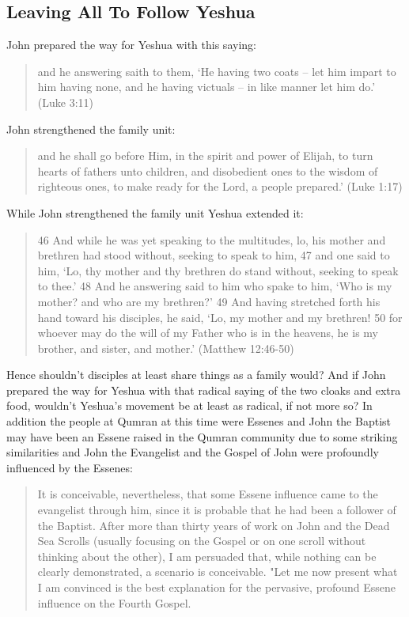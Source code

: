 \documentclass[11pt]{article}
\begin{document}
\subsection{Leaving All To Follow Yeshua} \label{leaving all to follow yeshua}
John prepared the way for Yeshua with this saying:
\begin{quote}
and he answering saith to them, `He having two coats -- let him impart to him having none, and he having victuals -- in like manner let him do.' (Luke 3:11) 
\end{quote}
John strengthened the family unit: 
\begin{quote}
and he shall go before Him, in the spirit and power of Elijah, to turn hearts of fathers unto children, and disobedient ones to the wisdom of righteous ones, to make ready for the Lord, a people prepared.' (Luke 1:17)
\end{quote}
While John strengthened the family unit Yeshua extended it: 
\begin{quote}
46 And while he was yet speaking to the multitudes, lo, his mother and brethren had stood without, seeking to speak to him, 47 and one said to him, `Lo, thy mother and thy brethren do stand without, seeking to speak to thee.' 48 And he answering said to him who spake to him, `Who is my mother? and who are my brethren?' 49 And having stretched forth his hand toward his disciples, he said, `Lo, my mother and my brethren! 50 for whoever may do the will of my Father who is in the heavens, he is my brother, and sister, and mother.' (Matthew 12:46-50)
\end{quote}
Hence shouldn't disciples at least share things as a family would? And if John prepared the way for Yeshua with that radical saying of the two cloaks and extra food, wouldn't Yeshua's movement be at least as radical, if not more so? In addition the people at Qumran at this time were Essenes \cite{John the Baptist and the Qumran Connection} and John the Baptist may have been an Essene raised in the Qumran community due to some striking similarities \cite{John the Baptist and the Qumran Connection} and John the Evangelist and the Gospel of John were profoundly influenced by the Essenes: 
\begin{quote}
It is conceivable, nevertheless, that some Essene influence came to the evangelist through him, since it is probable that he had been a follower of the Baptist. After more than thirty years of work on John and the Dead Sea Scrolls (usually focusing on the Gospel or on one scroll without thinking about the other), I am persuaded that, while nothing can be clearly demonstrated, a scenario is conceivable. "Let me now present what I am convinced is the best explanation for the pervasive, profound Essene influence on the Fourth Gospel. \cite{Exploring the Gospel of John}
\end{quote}
\end{document}
